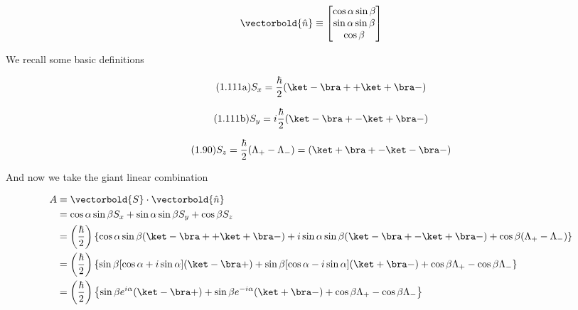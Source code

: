 \begin{answer}
  \begin{equation}
    \vectorbold{\hat{n}}
    \equiv
    \begin{bmatrix}
      \cos{\alpha}\sin{\beta}\\
      \sin{\alpha}\sin{\beta}\\
      \cos{\beta}\\
    \end{bmatrix}
  \end{equation}

  We recall some basic definitions
  
  \begin{equation}
    \tag{1.111a}
    S_x = \frac \hbar 2 (\ket - \bra + + \ket + \bra -)
  \end{equation}

  \begin{equation}
    \tag{1.111b}
    S_y = i \frac \hbar 2 (\ket - \bra + - \ket + \bra -)
  \end{equation}
  
  \begin{equation}
    \tag{1.90}
    S_z = \frac \hbar 2 (\Lambda_+ - \Lambda_-) = (\ket + \bra + - \ket - \bra -)
  \end{equation}

  And now we take the giant linear combination
  
  \begin{equation}
    \begin{split}
      A
      &\equiv \vectorbold{S}\cdot\vectorbold{\hat{n}}\\
      &= \cos{\alpha}\sin{\beta}S_x + \sin{\alpha}\sin{\beta}S_y + \cos{\beta}S_z\\
      &= \left(\frac \hbar 2\right)\left\{
        \cos{\alpha}\sin{\beta}(\ket - \bra + + \ket + \bra -)
        + i\sin{\alpha}\sin{\beta}(\ket - \bra + - \ket + \bra -)
        + \cos{\beta}(\Lambda_+ - \Lambda_-)
        \right\}\\
      &= \left(\frac \hbar 2\right)\left\{
        \sin{\beta}[\cos{\alpha} + i\sin{\alpha}](\ket - \bra +)
        + \sin{\beta}[\cos{\alpha} - i\sin{\alpha}](\ket + \bra -)
        + \cos{\beta}\Lambda_+
        - \cos{\beta}\Lambda_-
      \right\}\\
      &= \left(\frac \hbar 2\right)\left\{
        \sin{\beta}e^{i\alpha}(\ket - \bra +)
        + \sin{\beta}e^{-i\alpha}(\ket + \bra -)
        + \cos{\beta}\Lambda_+
        - \cos{\beta}\Lambda_-
      \right\}\\
    \end{split}
  \end{equation}


\end{answer}
